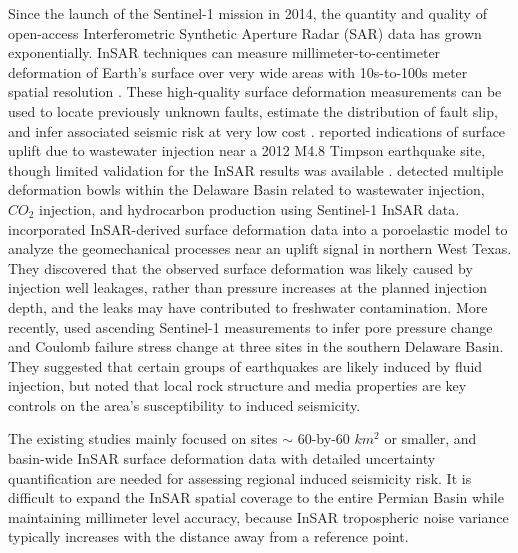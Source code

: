Since the launch of the Sentinel-1 mission in 2014, the quantity and quality of open-access Interferometric Synthetic Aperture Radar (SAR) data has grown exponentially. InSAR techniques can measure millimeter-to-centimeter deformation of Earth's surface over very wide areas with 10s-to-100s meter spatial resolution \citep{Massonnet1993DisplacementFieldLanders, Buergmann2000SyntheticApertureRadar}. These high-quality surface deformation measurements can be used to locate previously unknown faults, estimate the distribution of fault slip, and infer associated seismic risk at very low cost \citep{Segall2010EarthquakeVolcanoDeformation, Elliott2016RoleSpaceBased, Huang2017FaultGeometryInversion}. \cite{Shirzaei2016SurfaceUpliftTime} reported indications of surface uplift due to wastewater injection near a 2012 M4.8 Timpson earthquake site, though limited validation for the InSAR results was available \citep{Semple2017IncompleteInventorySuspected}.
\cite{Kim2018AssociationLocalizedGeohazards} detected multiple deformation bowls within the Delaware Basin related to wastewater injection, $CO_2$ injection, and hydrocarbon production using Sentinel-1 InSAR data. \cite{Zheng2019WastewaterLeakageWest} incorporated InSAR-derived surface deformation data into a poroelastic model to analyze the geomechanical processes near an uplift signal in northern West Texas. They discovered that the observed surface deformation was likely caused by injection well leakages, rather than pressure increases at the planned injection depth, and the leaks may have contributed to freshwater contamination. More recently, \cite{Deng2020SurfaceDeformationInduced} used ascending Sentinel-1 measurements to infer pore pressure change and Coulomb failure stress change at three sites in the southern Delaware Basin. They suggested that certain groups of earthquakes are likely induced by fluid injection, but noted that local rock structure and media properties are key controls on the area's susceptibility to induced seismicity.



The existing studies mainly focused on sites $ \sim $ 60-by-60 $km^2$ or smaller, and basin-wide InSAR surface deformation data with detailed uncertainty quantification are needed for assessing regional induced seismicity risk. It is difficult to expand the InSAR spatial coverage to the entire Permian Basin while maintaining millimeter level accuracy, because InSAR tropospheric noise variance typically increases with the distance away from a reference point.

